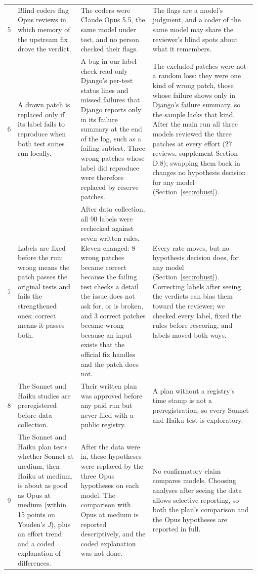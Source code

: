 \documentclass[sigconf,nonacm]{acmart}
\begin{document}
\begin{table}[t]
\begin{tabular}{@{}r L{0.26\textwidth} L{0.33\textwidth} L{0.32\textwidth}@{}}
5 & Blind coders flag Opus reviews in which memory of the upstream fix drove the verdict. & The coders were Claude Opus 5.5, the same model under test, and no person checked their flags. & The flags are a model's judgment, and a coder of the same model may share the reviewer's blind spots about what it remembers. \\
6 & A drawn patch is replaced only if its label fails to reproduce when both test suites run locally. & A bug in our label check read only Django's per-test status lines and missed failures that Django reports only in its failure summary at the end of the log, such as a failing subtest. Three wrong patches whose label did reproduce were therefore replaced by reserve patches. & The excluded patches were not a random loss: they were one kind of wrong patch, those whose failure shows only in Django's failure summary, so the sample lacks that kind. After the main run all three models reviewed the three patches at every effort (27 reviews, supplement Section D.8); swapping them back in changes no hypothesis decision for any model (Section~\ref{sec:robust}). \\
7 & Labels are fixed before the run: wrong means the patch passes the original tests and fails the strengthened ones; correct means it passes both. & After data collection, all 90 labels were rechecked against seven written rules. Eleven changed: 8 wrong patches became correct because the failing test checks a detail the issue does not ask for, or is broken, and 3 correct patches became wrong because an input exists that the official fix handles and the patch does not. & Every rate moves, but no hypothesis decision does, for any model (Section~\ref{sec:robust}). Correcting labels after seeing the verdicts can bias them toward the reviewer; we checked every label, fixed the rules before rescoring, and labels moved both ways. \\
8 & The Sonnet and Haiku studies are preregistered before data collection. & Their written plan was approved before any paid run but never filed with a public registry. & A plan without a registry's time stamp is not a preregistration, so every Sonnet and Haiku test is exploratory. \\
9 & The Sonnet and Haiku plan tests whether Sonnet at medium, then Haiku at medium, is about as good as Opus at medium (within 15 points on Youden's \textit{J}), plus an effort trend and a coded explanation of differences. & After the data were in, these hypotheses were replaced by the three Opus hypotheses on each model. The comparison with Opus at medium is reported descriptively, and the coded explanation was not done. & No confirmatory claim compares models. Choosing analyses after seeing the data allows selective reporting, so both the plan's comparison and the Opus hypotheses are reported in full. \\

\end{tabular}
\end{table}
\end{document}
